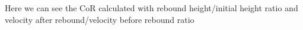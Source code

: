 \documentclass[preview]{standalone}
\begin{document}
\begin{center}
Here we can see the CoR calculated with rebound height/initial height ratio and velocity after rebound/velocity before rebound ratio
\end{center}
\end{document}
